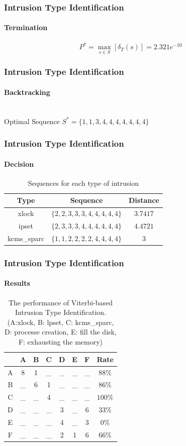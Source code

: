 \documentclass{beamer}
\begin{document}
\begin{frame}
  \frametitle{Intrusion Type Identification}
  \framesubtitle{Termination}
  $$
  P^{*} = \max\limits_{s \in S}[\delta_T(s)] = 2.321e^{-10}
  $$
\end{frame}
\begin{frame}
  \frametitle{Intrusion Type Identification}
  \framesubtitle{Backtracking}
  \\
  Optimal Sequence $ S^{*} = \{1,1,3,4,4,4,4,4,4,4\}$
\end{frame}
\begin{frame}
  \frametitle{Intrusion Type Identification}
  \framesubtitle{Decision}
  \begin{table}
    \caption{\label{tab:type}Sequences for each type of intrusion}
    \begin{tabular}{|c|c|c|}
      \hline
      Type & Sequence & Distance \\ \hline
      xlock & $\{2,2,3,3,3,4,4,4,4,4\}$ & $3.7417$ \\ \hline
      ipset & $\{2,3,3,3,4,4,4,4,4,4\}$ & $4.4721$ \\ \hline
      kcms\_sparc & $\{1,1,2,2,2,2,4,4,4,4\}$ & $3$ \\ \hline
    \end{tabular}
  \end{table}
\end{frame}
\begin{frame}
  \frametitle{Intrusion Type Identification}
  \framesubtitle{Results}
  \begin{table}[h]
    \centering
    \caption{\label{tab:IDS}The performance of Viterbi-based Intrusion
      Type Identification. (A:xlock, B: lpset, C:
kcms\_sparc, D: processe creation, E: fill the disk, F: exhausting the memory)}
    \begin{tabular}{|c| c|c | c | c | c | c | c |}
      \hline & A & B &C &D &E &F &Rate \\ \hline
      A & 8 & 1 & \_ & \_ & \_ & \_ & $88\%$ \\ \hline
      B & \_ & 6 & 1  & \_ & \_ & \_& $86\%$ \\ \hline
      C & \_ & \_ & 4 & \_ & \_ & \_ & $100\%$ \\ \hline
      D & \_ & \_ & \_ & 3 & \_ & 6 &$33\%$ \\ \hline \hline
      E & \_ & \_ & \_ & 4 & \_ & 3 &$0\%$ \\ \hline
      F & \_ & \_ & \_ & 2 & 1 & 6 &$66\%$ \\ \hline
    \end{tabular}
  \end{table}    
\end{frame}
\end{document}
